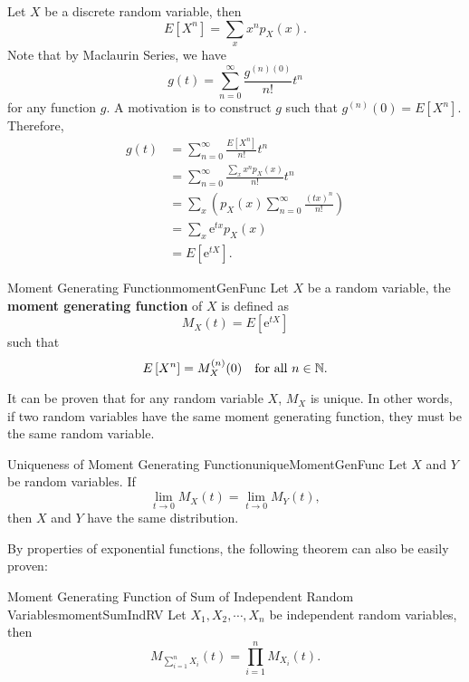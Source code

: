 \documentclass[math]{amznotes}
\theoremstyle{remark}
\newcommand{\e}{\mathrm{e}}
\begin{document}
Let $X$ be a discrete random variable, then 
\begin{equation*}
    E\left[X^n\right] = \sum_{x}x^np_X(x).
\end{equation*}
Note that by Maclaurin Series, we have
\begin{equation*}
    g(t) = \sum_{n = 0}^{\infty}\frac{g^{(n)(0)}}{n!}t^n
\end{equation*}
for any function $g$. A motivation is to construct $g$ such that $g^{(n)}(0) = E\left[X^n\right]$. Therefore,
\begin{align*}
    g(t) & = \sum_{n = 0}^{\infty}\frac{E\left[X^n\right]}{n!}t^n \\
    & = \sum_{n = 0}^{\infty}\frac{\sum_{x}x^np_X(x)}{n!}t^n \\
    & = \sum_{x}\left(p_X(x)\sum_{n = 0}^{\infty}\frac{(tx)^n}{n!}\right) \\
    & = \sum_{x}\e^{tx}p_X(x) \\
    & = E\left[\e^{tX}\right].
\end{align*}
\begin{dfnbox}{Moment Generating Function}{momentGenFunc}
    Let $X$ be a random variable, the {\color{red} \textbf{moment generating function}} of $X$ is defined as 
    \begin{equation*}
        M_X(t) = E\left[\e^{tX}\right]
    \end{equation*}
    such that 
    \begin{equation*}
        E\left[X^n\right] = M_X^{(n)}(0) \quad\textrm{for all } n \in \mathbb{N}.
    \end{equation*}
\end{dfnbox}
It can be proven that for any random variable $X$, $M_X$ is unique. In other words, if two random variables have the same moment generating function, they must be the same random variable.
\begin{thmbox}{Uniqueness of Moment Generating Function}{uniqueMomentGenFunc}
    Let $X$ and $Y$ be random variables. If
    \begin{equation*}
        \lim_{t \to 0}M_X(t) = \lim_{t \to 0}M_Y(t),
    \end{equation*}
    then $X$ and $Y$ have the same distribution.
\end{thmbox}
By properties of exponential functions, the following theorem can also be easily proven:
\begin{probox}{\small Moment Generating Function of Sum of Independent Random Variables}{momentSumIndRV}
    Let $X_1, X_2, \cdots, X_n$ be independent random variables, then 
    \begin{equation*}
        M_{\sum_{i = 1}^{n}X_i}(t) = \prod_{i = 1}^{n}M_{X_i}(t).
    \end{equation*}
\end{probox}
\end{document}
